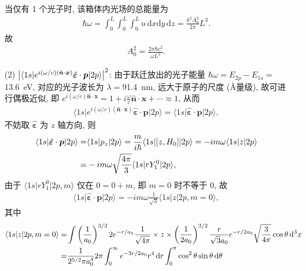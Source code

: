 \documentclass{assignment}
\begin{document}
\begin{pf}
\begin{itemize}
        当仅有 1 个光子时, 该箱体内光场的总能量为
        \begin{align}
            \hbar\omega=\int_0^L\int_0^L\int_0^Lu\,\mathrm{d}x\mathrm{d}y\,\mathrm{d}z=\frac{k^2A_0^2}{2\pi}L^3.
        \end{align}
        故
        \begin{align}
            A_0^2=\frac{2\pi\hbar c^2}{\omega L^3}.
        \end{align}
        \item[(2)] \uline{$\left\lvert\langle 1s\rvert e^{i(\omega/c)(\hat{\bm{n}}\cdot\bm{x})}\hat{\bm{\varepsilon}}\cdot\bm{p}\lvert 2p\rangle\right\rvert^2$}: 由于跃迁放出的光子能量 $\hbar\omega=E_{2p}-E_{1s}=$\SI{13.6}{eV}, 对应的光子波长为 $\lambda=$\SI{91.4}{nm}, 远大于原子的尺度 (\AA 量级), 故可进行偶极近似, 即 $e^{i(\omega/c)\hat{\bm{n}}\cdot\bm{x}}=1+i\frac{\omega}{c}\hat{\bm{n}}\cdot\bm{x}+\cdots\approx 1$, 从而
        \begin{align}
            \langle 1s\rvert e^{i(\omega/c)(\hat{\bm{n}}\cdot\bm{x})}\hat{\bm{\varepsilon}}\cdot\bm{p}\lvert 2p\rangle=\langle 1s\rvert\hat{\bm{\varepsilon}}\cdot\bm{p}\lvert 2p\rangle,
        \end{align}
        不妨取 $\hat{\bm{\varepsilon}}$ 为 $z$ 轴方向, 则
        \begin{align}
            \notag\langle 1s\rvert\hat{\bm{\varepsilon}}\cdot\bm{p}\lvert 2p\rangle=&\langle 1s\rvert p_z\lvert 2p\rangle=\frac{m}{i\hbar}\langle 1s\rvert[z,H_0]\lvert 2p\rangle=-im\omega\langle 1s\rvert z\lvert 2p\rangle\\
            =&-im\omega\sqrt{\frac{4\pi}{3}}\langle 1s\rvert rY_1^0\lvert 2p\rangle,
        \end{align}
        由于 $\langle 1s\rvert rY_1^0\lvert 2p,m\rangle$ 仅在 $0=0+m$, 即 $m=0$ 时不等于 $0$, 故
        \begin{align}
            \langle 1s\rvert\hat{\bm{\varepsilon}}\cdot\bm{p}\lvert 2p\rangle=-im\omega\frac{1}{\sqrt{3}}\langle 1s\rvert z\lvert 2p,m=0\rangle,
        \end{align}
        其中
        \begin{align}
            \langle 1s\rvert z\lvert 2p,m=0\rangle=&\int\left(\frac{1}{a_0}\right)^{3/2}2e^{-r/a_0}\frac{1}{\sqrt{4\pi}}\times z\times\left(\frac{1}{2a_0}\right)^{3/2}\frac{r}{\sqrt{3}a_0}e^{-r/2a_0}\sqrt{\frac{3}{4\pi}}\cos\theta\,\mathrm{d}^3x\\
            \notag=&\frac{1}{2^{5/2}\pi a_0^4}2\pi\int_0^{\infty}e^{-3r/2a_0}r^4\,\mathrm{d}r\int_0^{\pi}\cos^2\theta\sin\theta\,\mathrm{d}\theta\\

\end{align}
\end{itemize}
\end{pf}
\end{document}

